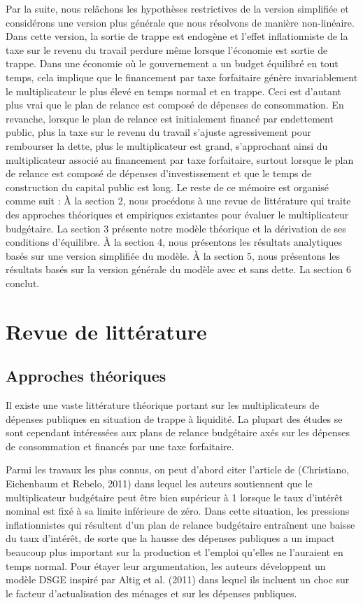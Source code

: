 \documentclass[12pt,letterpaper]{article}
\begin{document}
Par la suite, nous relâchons les hypothèses restrictives de la version simplifiée et considérons une version plus générale que nous résolvons de manière non-linéaire. Dans cette version, la sortie de trappe est endogène et l’effet inflationniste de la taxe sur le revenu du travail perdure même lorsque l’économie est sortie de trappe. Dans une économie où le gouvernement a un budget équilibré en tout temps, cela implique que le financement par taxe forfaitaire génère invariablement le multiplicateur le plus élevé en temps normal et en trappe. Ceci est d’autant plus vrai que le plan de relance est composé de dépenses de consommation. En revanche, lorsque le plan de relance est initialement financé par endettement public, plus la taxe sur le revenu du travail s’ajuste agressivement pour rembourser la dette, plus le multiplicateur est grand, s’approchant ainsi du multiplicateur associé au financement par taxe forfaitaire, surtout lorsque le plan de relance est composé de dépenses d’investissement et que le temps de construction du capital public est long. Le reste de ce mémoire est organisé comme suit : À la section 2, nous procédons à une revue de littérature qui traite des approches théoriques et empiriques existantes pour évaluer le multiplicateur budgétaire. La section 3 présente notre modèle théorique et la dérivation de ses conditions d’équilibre. À la section 4, nous présentons les résultats analytiques basés sur une version simplifiée du modèle. À la section 5, nous présentons les résultats basés sur la version générale du modèle avec et sans dette. La section 6 conclut.

\section{Revue de littérature}

\subsection{Approches théoriques}

Il existe une vaste littérature théorique portant sur les multiplicateurs de dépenses publiques en situation de trappe à liquidité. La plupart des études se sont cependant intéressées aux plans de relance budgétaire axés sur les dépenses de consommation et financés par une taxe forfaitaire.

Parmi les travaux les plus connus, on peut d’abord citer l’article de (Christiano, Eichenbaum et Rebelo, 2011) dans lequel les auteurs soutiennent que le multiplicateur budgétaire peut être bien supérieur à 1 lorsque le taux d'intérêt nominal est fixé à sa limite inférieure de zéro. Dans cette situation, les pressions inflationnistes qui résultent d’un plan de relance budgétaire entraînent une baisse du taux d’intérêt, de sorte que la hausse des dépenses publiques a un impact beaucoup plus important sur la production et l'emploi qu’elles ne l’auraient en temps normal. Pour étayer leur argumentation, les auteurs développent un modèle DSGE inspiré par Altig et al. (2011) dans lequel ils incluent un choc sur le facteur d’actualisation des ménages et sur les dépenses publiques.
\end{document}
